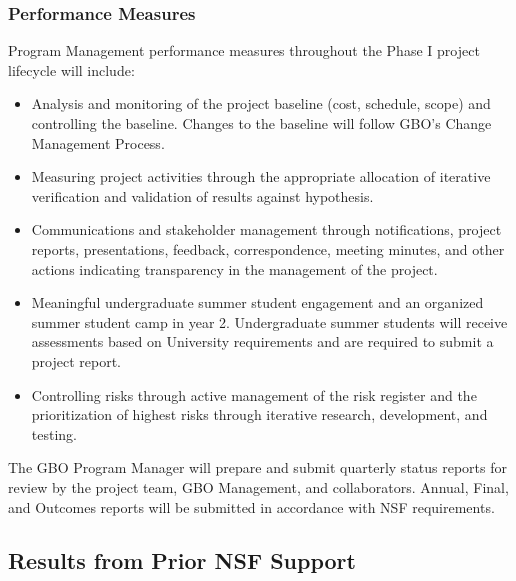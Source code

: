 \documentclass[10pt]{myNSF}
\begin{document}
\subsubsection{Performance Measures}
\label{sec:performance_measures}

Program Management performance measures throughout the Phase {\sc I}
project lifecycle will include:
\begin{itemize}
\item{Analysis and monitoring of the project baseline (cost, schedule,
    scope) and controlling the baseline.  Changes to the baseline will
    follow GBO’s Change Management Process.}
\item{Measuring project activities through the appropriate allocation
    of iterative verification and validation of results against
    hypothesis.}
\item{Communications and stakeholder management through notifications,
    project reports, presentations, feedback, correspondence, meeting
    minutes, and other actions indicating transparency in the
    management of the project.}
\item{Meaningful undergraduate summer student engagement and an
    organized summer student camp in year 2. Undergraduate summer
    students will receive assessments based on University requirements
    and are required to submit a project report.}
\item{Controlling risks through active management of the risk register
    and the prioritization of highest risks through iterative
    research, development, and testing.}
\end{itemize}
The GBO Program Manager will prepare and submit quarterly status
reports for review by the project team, GBO Management, and
collaborators. Annual, Final, and Outcomes reports will be submitted
in accordance with NSF requirements.


\subsection{Results from Prior NSF Support}
\label{sec:prior_support}
\end{document}
